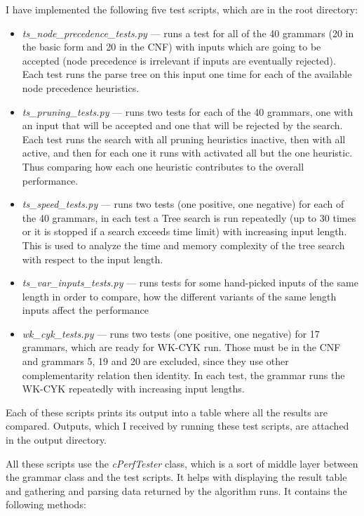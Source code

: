 I have implemented the following five test scripts, which are in the root directory:
\begin{itemize}
  \item{\textit{ts\_node\_precedence\_tests.py} --- runs a test for all of the 40 grammars (20 in the basic form and 20 in the CNF) with inputs which are going to be accepted (node precedence is irrelevant if inputs are eventually rejected). Each test runs the parse tree on this input one time for each of the available node precedence heuristics.}

  \item{\textit{ts\_pruning\_tests.py} --- runs two tests for each of the 40 grammars, one with an input that will be accepted and one that will be rejected by the search. Each test runs the search with all pruning heuristics inactive, then with all active, and then for each one it runs with activated all but the one heuristic. Thus comparing how each one heuristic contributes to the overall performance.}

  \item{\textit{ts\_speed\_tests.py} --- runs two tests (one positive, one negative) for each of the 40 grammars, in each test a Tree search is run repeatedly (up to 30 times or it is stopped if a search exceeds time limit) with increasing input length. This is used to analyze the time and memory complexity of the tree search with respect to the input length.}

  \item{\textit{ts\_var\_inputs\_tests.py} --- runs tests for some hand-picked inputs of the same length in order to compare, how the different variants of the same length inputs affect the performance}

  \item{\textit{wk\_cyk\_tests.py} --- runs two tests (one positive, one negative) for 17 grammars, which are ready for WK-CYK run. Those must be in the CNF and grammars 5, 19 and 20 are excluded, since they use other complementarity relation then identity. In each test, the grammar runs the WK-CYK repeatedly with increasing input lengths.}
\end{itemize}

Each of these scripts prints its output into a table where all the results are compared. Outputs, which I received by running these test scripts, are attached in the output directory.

All these scripts use the \textit{cPerfTester} class, which is a sort of middle layer between the grammar class and the test scripts. It helps with displaying the result table and gathering and parsing data returned by the algorithm runs.
It contains the following methods:

